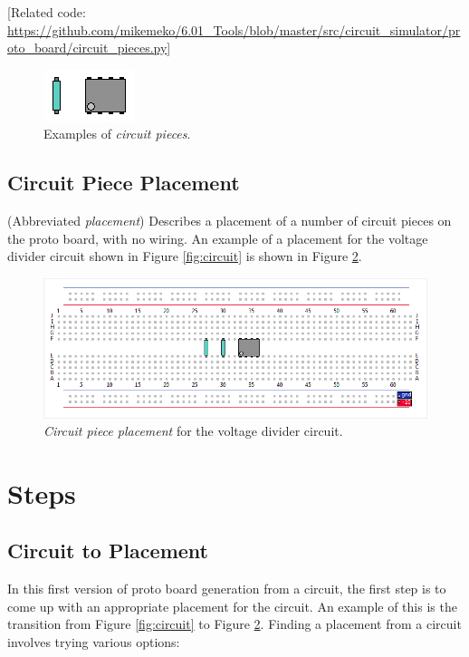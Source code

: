 \documentclass[12pt]{amsart}
\begin{document}
[Related code: \url{https://github.com/mikemeko/6.01_Tools/blob/master/src/circuit_simulator/proto_board/circuit_pieces.py}]

\begin{figure}
\includegraphics{Images/Circuit_Pieces.png}
\caption{Examples of \emph{circuit pieces}.}
\label{fig:pieces}
\end{figure}

\subsection{Circuit Piece Placement}

(Abbreviated \emph{placement}) Describes a placement of a number of circuit pieces on the proto board, with no wiring. An example of a placement for the voltage divider circuit shown in Figure \ref{fig:circuit} is shown in Figure \ref{fig:placement}.

\begin{figure}
\includegraphics[width=\linewidth]{Images/Circuit_Piece_Placement.png}
\caption{\emph{Circuit piece placement} for the voltage divider circuit.}
\label{fig:placement}
\end{figure}

\section{Steps}

\subsection{Circuit to Placement}

In this first version of proto board generation from a circuit, the first step is to come up with an appropriate placement for the circuit. An example of this is the transition from Figure \ref{fig:circuit} to Figure \ref{fig:placement}. Finding a placement from a circuit involves trying various options:
\end{document}

